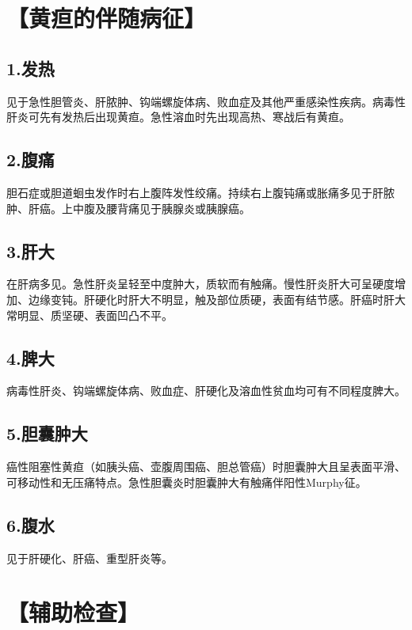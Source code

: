 \section{【黄疸的伴随病征】}

\subsection{1.发热}

见于急性胆管炎、肝脓肿、钩端螺旋体病、败血症及其他严重感染性疾病。病毒性肝炎可先有发热后出现黄疸。急性溶血时先出现高热、寒战后有黄疸。

\subsection{2.腹痛}

胆石症或胆道蛔虫发作时右上腹阵发性绞痛。持续右上腹钝痛或胀痛多见于肝脓肿、肝癌。上中腹及腰背痛见于胰腺炎或胰腺癌。

\subsection{3.肝大}

在肝病多见。急性肝炎呈轻至中度肿大，质软而有触痛。慢性肝炎肝大可呈硬度增加、边缘变钝。肝硬化时肝大不明显，触及部位质硬，表面有结节感。肝癌时肝大常明显、质坚硬、表面凹凸不平。

\subsection{4.脾大}

病毒性肝炎、钩端螺旋体病、败血症、肝硬化及溶血性贫血均可有不同程度脾大。

\subsection{5.胆囊肿大}

癌性阻塞性黄疸（如胰头癌、壶腹周围癌、胆总管癌）时胆囊肿大且呈表面平滑、可移动性和无压痛特点。急性胆囊炎时胆囊肿大有触痛伴阳性Murphy征。

\subsection{6.腹水}

见于肝硬化、肝癌、重型肝炎等。

\section{【辅助检查】}

